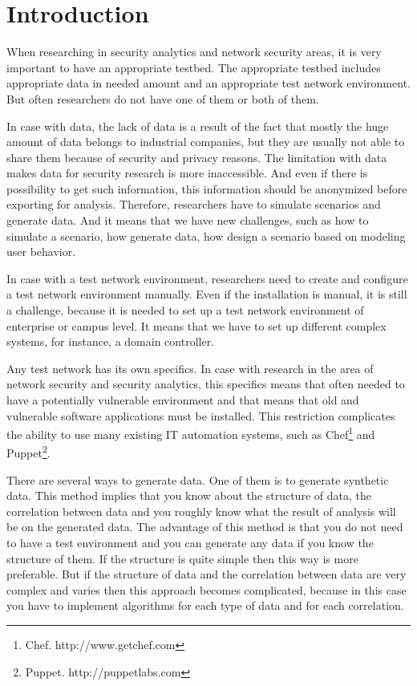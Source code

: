 \section{Introduction}


When researching in security analytics and network security areas, it is very important to have an appropriate testbed. The appropriate testbed includes appropriate data in needed amount and an appropriate test network environment. But often researchers do not have one of them or both of them.  

In case with data, the lack of data is a result of the fact that mostly the huge amount of data belongs to industrial companies, but they are usually not able to share them because of security and privacy reasons. The limitation with data makes data for security research is more inaccessible. And even if there is possibility to get such information, this information should be anonymized before exporting for analysis. Therefore, researchers have to simulate scenarios and generate data. And it means that we have new challenges, such as how to simulate a scenario, how generate data, how design a scenario based on modeling user behavior. 

In case with a test network environment, researchers need to create and configure a test network environment manually. Even if the installation is manual, it is still a challenge, because it is needed to set up a test network environment of enterprise or campus level. It means that we have to set up different complex systems, for instance, a domain controller. 

Any test network has its own specifics. In case with research in the area of network security and security analytics, this specifics means that often needed to have a potentially vulnerable environment and that means that old and vulnerable software applications must be installed. This restriction complicates the ability to use many existing IT automation systems, such as Chef\footnote{Chef. http://www.getchef.com} and Puppet\footnote{Puppet. http://puppetlabs.com}. %

There are several ways to generate data. One of them is to generate synthetic data. This method implies that you know about the structure of data, the correlation between data and you roughly know what the result of analysis will be on the generated data. The advantage of this method is that you do not need to have a test environment and you can generate any data if you know the structure of them. If the structure is quite simple then this way is more preferable. But if the structure of data and the correlation between data are very complex and varies then this approach becomes complicated, because in this case you have to implement algorithms for each type of data and for each correlation. 

